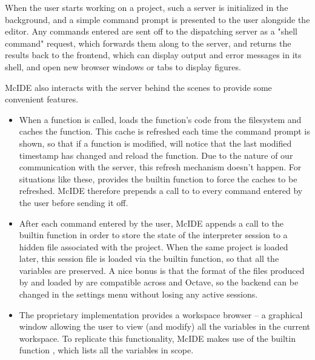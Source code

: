 When the user starts working on a project, such a \matlab server is initialized
in the background, and a simple command prompt is presented to the user
alongside the editor. Any commands entered are sent off to the dispatching
server as a "shell command" request, which forwards them along to the \matlab
server, and returns the results back to the frontend, which can display output
and error messages in its shell, and open new browser windows or tabs to
display figures.

McIDE also interacts with the \matlab server behind the scenes to provide some
convenient features.

\begin{itemize}

\item When a function is called, \matlab loads the function's code from the
filesystem and caches the function. This cache is refreshed each time the
command prompt is shown, so that if a function is modified, \matlab will notice
that the last modified timestamp has changed and reload the function. Due to
the nature of our communication with the \matlab server, this refresh mechanism
doesn't happen. For situations like these, \matlab provides the 
builtin function to force the caches to be refreshed. McIDE therefore prepends
a call to  to every command entered by the user before sending it
off.

\item After each command entered by the user, McIDE appends a call to the
 \matlab builtin function in order to store the state of the
interpreter session to a hidden file associated with the project. When the same
project is loaded later, this session file is loaded via the builtin
 function, so that all the variables are preserved. A nice bonus is
that the format of the files produced by  and loaded by 
are compatible across \matlab and Octave, so the backend can be changed in the
settings menu without losing any active sessions.

\item The proprietary \matlab implementation provides a workspace browser -- a
graphical window allowing the user to view (and modify) all the variables in
the current workspace. To replicate this functionality, McIDE makes use of the
\matlab builtin function , which lists all the variables in scope.

\end{itemize}

